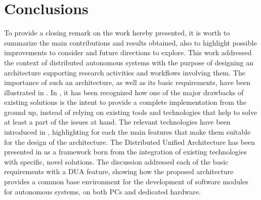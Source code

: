 \chapter{Conclusions}
\label{ch:conclusions}
\vspace{-1.3cm}

To provide a closing remark on the work hereby presented, it is worth to summarize the main contributions and results obtained, also to highlight possible improvements to consider and future directions to explore. This work addressed the context of distributed autonomous systems with the purpose of designing an architecture supporting research activities and workflows involving them. The importance of such an architecture, as well as its basic requirements, have been illustrated in . In , it has been recognized how one of the major drawbacks of existing solutions is the intent to provide a complete implementation from the ground up, instead of relying on existing tools and technologies that help to solve at least a part of the issues at hand. The relevant technologies have been introduced in , highlighting for each the main features that make them suitable for the design of the architecture. The Distributed Unified Architecture has been presented in  as a framework born from the integration of existing technologies with specific, novel solutions. The discussion addressed each of the basic requirements with a DUA feature, showing how the proposed architecture provides a common base environment for the development of software modules for autonomous systems, on both PCs and dedicated hardware.

